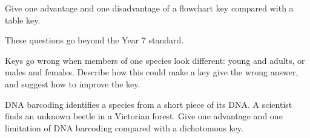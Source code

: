 \task Give one advantage and one disadvantage of a flowchart key compared with a table key.
\answerbox{5cm}

\label{ext:4}

\begin{yr8box}
These questions go beyond the Year 7 standard.

\medskip
\begin{keepext}
\exttask Keys go wrong when members of one species look different: young and adults, or males and females. Describe how this could make a key give the wrong answer, and suggest how to improve the key.
\answerbox{5cm}
\end{keepext}
\begin{keepext}
\exttask DNA barcoding identifies a species from a short piece of its DNA. A scientist finds an unknown beetle in a Victorian forest. Give one advantage and one limitation of DNA barcoding compared with a dichotomous key.
\answerbox{5cm}
\end{keepext}
\end{yr8box}
